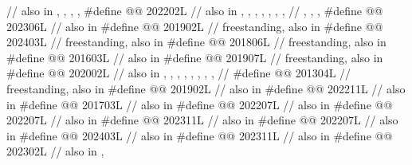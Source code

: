 \begin{codeblock}
  // also in , , , , 
#define @@                 202202L
  // also in , , , , , , ,
  // , , , 
#define @@                 202306L // also in 
#define @@                         201902L // freestanding, also in 
#define @@                         202403L // freestanding, also in 
#define @@                 201806L // freestanding, also in 
#define @@           201603L // also in 
#define @@                            201907L // freestanding, also in 
#define @@                          202002L
  // also in , , , , , , , ,
  // 
#define @@                 201304L // freestanding, also in 
#define @@                         201902L // also in 
#define @@                          202211L // also in 
#define @@                        201703L // also in 
#define @@                          202207L // also in 
#define @@                          202207L // also in 
#define @@                            202311L // also in 
#define @@                     202207L // also in 
#define @@                       202403L // also in 
#define @@                      202311L // also in 
#define @@                        202302L // also in , 

\end{codeblock}
